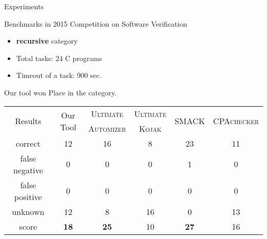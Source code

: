 \begin{frame}{Experiments}

  Benchmarks in 2015 Competition on Software Verification
  \begin{itemize}
    \item \textbf{recursive} category
    \item Total tasks: 24 C programs
    \item Timeout of a task: 900 sec.
  \end{itemize}
  Our tool won  Place in the category.

\begin{table}
\resizebox{\textwidth}{!}
{
\begin{tabular}{|c|cc|c|c|c|c|}
\hline
\multirow{2}{*}{Results} & \multicolumn{2}{c|}{\multirow{2}{*}{Our Tool}} & \textsc{Ultimate} & \textsc{Ultimate} & \multirow{2}{*}{\textsc{SMACK}} & \multirow{2}{*}{\textsc{CPAchecker}} \\ 
& & & \textsc{Automizer} & \textsc{Kojak} & & \\
\hline\hline
correct          & \multicolumn{2}{c|}{12}   & 16  & 8  & 23 & 11 \\ 
false negative   & \multicolumn{2}{c|}{0}    & 0   & 0  & 1  & 0 \\
false positive   & \multicolumn{2}{c|}{0}    & 0   & 0  & 0  & 0 \\
unknown          & \multicolumn{2}{c|}{12}   & 8   & 16 & 0  & 13 \\
\hline\hline
score            & \multicolumn{2}{c|}{\textbf{18}}   & \textbf{25}   & 10  & \textbf{27} & 16 \\
\hline
\end{tabular}
}
\end{table}

\end{frame}
